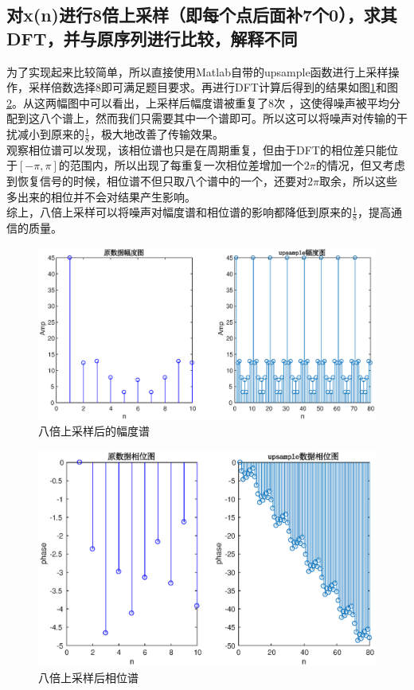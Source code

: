 \documentclass[UTF8]{article}
\begin{document}
\begin{CJK}{UTF8}{gkai}
\subsection{对x(n)进行8倍上采样（即每个点后面补7个0），求其DFT，并与原序列进行比较，解释不同}
为了实现起来比较简单，所以直接使用Matlab自带的upsample函数进行上采样操作，采样倍数选择8即可满足题目要求。再进行DFT计算后得到的结果如图\ref{pro1_fig5}和图\ref{pro1_fig6}。从这两幅图中可以看出，上采样后幅度谱被重复了8次 ，这使得噪声被平均分配到这八个谱上，然而我们只需要其中一个谱即可。所以这可以将噪声对传输的干扰减小到原来的$\frac{1}{8}$，极大地改善了传输效果。\\
观察相位谱可以发现，该相位谱也只是在周期重复，但由于DFT的相位差只能位于$[-\pi,\pi]$的范围内，所以出现了每重复一次相位差增加一个$2\pi$的情况，但又考虑到恢复信号的时候，相位谱不但只取八个谱中的一个，还要对$2\pi$取余，所以这些多出来的相位并不会对结果产生影响。\\
综上，八倍上采样可以将噪声对幅度谱和相位谱的影响都降低到原来的$\frac{1}{8}$，提高通信的质量。
\begin{figure}
  \includegraphics[scale=0.4]{pro1_subpro4_amp.eps}
  \caption{八倍上采样后的幅度谱}
  \label{pro1_fig5}
\end{figure}

\begin{figure}
  \includegraphics[scale=0.4]{pro1_subpro4_phase.eps}
  \caption{八倍上采样后相位谱}
  \label{pro1_fig6}
\end{figure}

\end{CJK}
\end{document}
